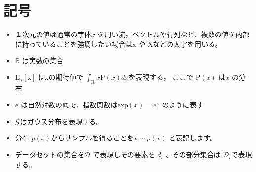 \chapter*{記号}
\label{thanks}


\begin{itemize}
    \item １次元の値は通常の字体$ x $ を用い流。ベクトルや行列など、複数の値を内部に持っていることを強調したい場合は$ \mathrm{x} $ や $ \mathrm{X} $などの太字を用いる。
    \item $\mathbb{R}$ は実数の集合
    \item $\mathrm{E_x[x]}$ はxの期待値で $ \int_{\mathrm{R}} x \mathrm{P}(x) dx $を表現する。 ここで $ \mathrm{P}(x) $ は$ x $ の分布
    \item $e$ は自然対数の底で、指数関数は$\mathrm{exp}(x) = e^x$ のように表す
    \item $ \mathcal{G} $はガウス分布を表現する。
    \item 分布 $p(x)$からサンプルを得ることを$ x \sim p(x) $ と表記します。
    \item データセットの集合を$ \mathcal{D} $ で表現しその要素を $ d_i $ 、その部分集合は $ \mathcal{D}_i $で表現する。

\end{itemize}